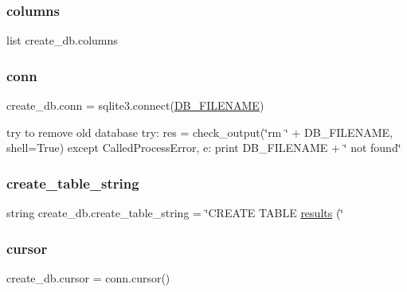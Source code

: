\subsubsection{\texorpdfstring{columns}{columns}}
{\footnotesize\ttfamily list create\+\_\+db.\+columns}

\mbox{\label{namespacecreate__db_acaffbe61c8fe2c0d0db0765f1d0a2b24}} 
\subsubsection{\texorpdfstring{conn}{conn}}
{\footnotesize\ttfamily create\+\_\+db.\+conn = sqlite3.\+connect(\hyperlink{namespacecreate__db_a3627484d56c47b0a96fdb9ff199694df}{D\+B\+\_\+\+F\+I\+L\+E\+N\+A\+ME})}



try to remove old database try\+: res = check\+\_\+output(\char`\"{}rm \char`\"{} + D\+B\+\_\+\+F\+I\+L\+E\+N\+A\+ME, shell=True) except Called\+Process\+Error, e\+: print D\+B\+\_\+\+F\+I\+L\+E\+N\+A\+ME + \char`\"{} not found\char`\"{} 

\mbox{\label{namespacecreate__db_a753b199ce11002d6f6c93550a6bf31ec}} 
\subsubsection{\texorpdfstring{create\+\_\+table\+\_\+string}{create\_table\_string}}
{\footnotesize\ttfamily string create\+\_\+db.\+create\+\_\+table\+\_\+string = \char`\"{}C\+R\+E\+A\+TE T\+A\+B\+LE \hyperlink{namespacecreate__db_a7926ceddf2e86e190ed055e87168b4d5}{results} (\char`\"{}}

\mbox{\label{namespacecreate__db_a8caadce67a98b8a3d859ceae2775bf63}} 
\subsubsection{\texorpdfstring{cursor}{cursor}}
{\footnotesize\ttfamily create\+\_\+db.\+cursor = conn.\+cursor()}

